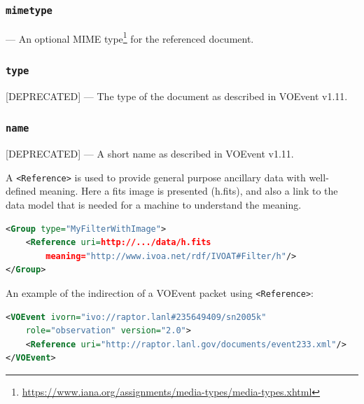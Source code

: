 \documentclass[11pt,a4paper]{ivoa}
\begin{document}
\subsubsection{\tt mimetype}\label{sec:3.9.3}--- An optional MIME type\footnote{\url{https://www.iana.org/assignments/media-types/media-types.xhtml}} for the referenced document. 
\subsubsection{\tt type}\label{sec:3.9.4}[DEPRECATED] --- The type of the document as described in VOEvent v1.11. 
\subsubsection{\tt name}\label{sec:3.9.5}[DEPRECATED] --- A short name as described in VOEvent v1.11. 

A {\tt <Reference>} is used to provide general purpose ancillary data with well-defined meaning. Here a fits image is presented (h.fits), and also a link to the data model that is needed for a machine to understand the meaning. 
\begin{lstlisting}[language=XML]
<Group type="MyFilterWithImage">
    <Reference uri=http://.../data/h.fits 
        meaning="http://www.ivoa.net/rdf/IVOAT#Filter/h"/>
</Group> 
\end{lstlisting}
An example of the indirection of a VOEvent packet using {\tt <Reference>}:  
\begin{lstlisting}[language=XML]
<VOEvent ivorn="ivo://raptor.lanl#235649409/sn2005k" 
    role="observation" version="2.0">   
    <Reference uri="http://raptor.lanl.gov/documents/event233.xml"/>
</VOEvent> 
\end{lstlisting}
\end{document}
